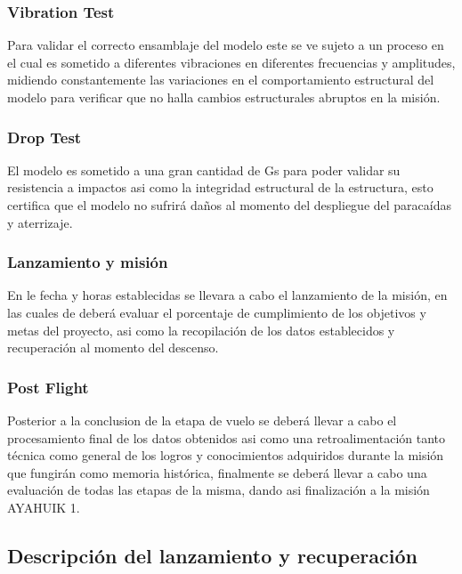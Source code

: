 \documentclass[letterpaper,12pt]{article} %
\begin{document}
        \subsubsection*{Vibration Test}

        Para validar el correcto ensamblaje del modelo este se ve sujeto a un proceso en el cual es sometido a diferentes vibraciones en diferentes frecuencias y amplitudes, midiendo 
        constantemente las variaciones en el comportamiento estructural del modelo para verificar que no halla cambios estructurales abruptos en la misión.
        
        \subsubsection*{Drop Test}

        El modelo es sometido a una gran cantidad de Gs para poder validar su resistencia a impactos asi como la integridad estructural de la estructura, esto certifica que el modelo 
        no sufrirá daños al momento del despliegue del paracaídas y aterrizaje.

    \subsubsection{Lanzamiento y misión}

    En le fecha y horas establecidas se llevara a cabo el lanzamiento de la misión, en las cuales de deberá evaluar el porcentaje de cumplimiento de los objetivos y metas del proyecto,
    asi como la recopilación de los datos establecidos y recuperación al momento del descenso.

    \subsubsection{Post Flight}

    Posterior a la conclusion de la etapa de vuelo se deberá llevar a cabo el procesamiento final de los datos obtenidos asi como una retroalimentación tanto técnica como general de los logros y conocimientos adquiridos durante la misión que fungirán como memoria histórica, finalmente se deberá llevar a cabo una evaluación 
    de todas las etapas de la misma, dando asi finalización a la misión AYAHUIK 1.



    \subsection{Descripción del lanzamiento y recuperación}
\end{document}
